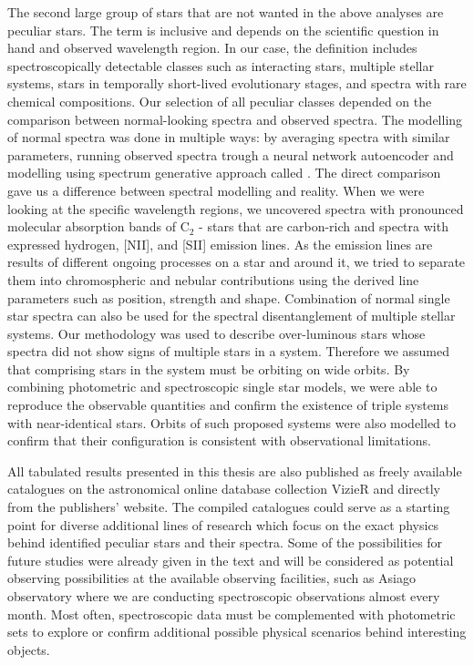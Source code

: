 The second large group of stars that are not wanted in the above analyses are peculiar stars. The term is inclusive and depends on the scientific question in hand and observed wavelength region. In our case, the definition includes spectroscopically detectable classes such as interacting stars, multiple stellar systems, stars in temporally short-lived evolutionary stages, and spectra with rare chemical compositions. Our selection of all peculiar classes depended on the comparison between normal-looking spectra and observed spectra. The modelling of normal spectra was done in multiple ways: by averaging spectra with similar parameters, running observed spectra trough a neural network autoencoder and modelling using spectrum generative approach called \TC. The direct comparison gave us a difference between spectral modelling and reality. When we were looking at the specific wavelength regions, we uncovered spectra with pronounced molecular absorption bands of C$_2$ - stars that are carbon-rich and spectra with expressed hydrogen, [NII], and [SII] emission lines. As the emission lines are results of different ongoing processes on a star and around it, we tried to separate them into chromospheric and nebular contributions using the derived line parameters such as position, strength and shape. Combination of normal single star spectra can also be used for the spectral disentanglement of multiple stellar systems. Our methodology was used to describe over-luminous stars whose spectra did not show signs of multiple stars in a system. Therefore we assumed that comprising stars in the system must be orbiting on wide orbits. By combining photometric and spectroscopic single star models, we were able to reproduce the observable quantities and confirm the existence of triple systems with near-identical stars. Orbits of such proposed systems were also modelled to confirm that their configuration is consistent with observational limitations.

All tabulated results presented in this thesis are also published as freely available catalogues on the astronomical online database collection VizieR and directly from the publishers' website. The compiled catalogues could serve as a starting point for diverse additional lines of research which focus on the exact physics behind identified peculiar stars and their spectra. Some of the possibilities for future studies were already given in the text and will be considered as potential observing possibilities at the available observing facilities, such as Asiago observatory where we are conducting spectroscopic observations almost every month. Most often, spectroscopic data must be complemented with photometric sets to explore or confirm additional possible physical scenarios behind interesting objects.

